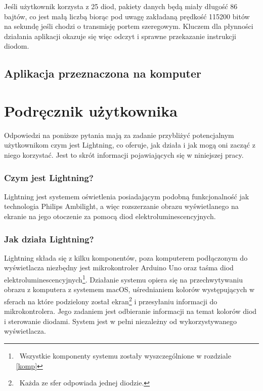 \documentclass[12pt]{report}
\begin{document}
Jeśli użytkownik korzysta z 25 diod, pakiety danych będą miały długość 86 bajtów, co jest małą liczbą biorąc pod uwagę zakładaną prędkość 115200 bitów na sekundę jeśli chodzi o transmisję portem szeregowym. Kluczem dla płynności działania aplikacji okazuje się więc odczyt i sprawne przekazanie instrukcji diodom.













\subsection{Aplikacja przeznaczona na komputer}














\section{Podręcznik użytkownika}

Odpowiedzi na poniższe pytania mają za zadanie przybliżyć potencjalnym użytkownikom czym jest Lightning, co oferuje, jak działa i jak mogą oni zacząć z niego korzystać. Jest to skrót informacji pojawiających się w niniejszej pracy.

\subsubsection{Czym jest Lightning?}

Lightning jest systemem oświetlenia posiadającym podobną funkcjonalność jak technologia Philips Ambilight, a więc rozszerzanie obrazu wyświetlanego na ekranie na jego otoczenie za pomocą diod elektroluminescencyjnych.

\subsubsection{Jak działa Lightning?}

Lightning składa się z kilku komponentów, poza komputerem podłączonym do wyświetlacza niezbędny jest mikrokontroler Arduino Uno oraz taśma diod elektroluminescencyjnych\footnote{~Wszystkie komponenty systemu zostały wyszczególnione w rozdziale \ref{komp}}. Działanie systemu opiera się na przechwytywaniu obrazu z komputera z systemem macOS, uśrednianiem kolorów występujących w sferach na które podzielony został ekran\footnote{~Każda ze sfer odpowiada jednej diodzie.} i przesyłaniu informacji do mikrokontrolera. Jego zadaniem jest odbieranie informacji na temat kolorów diod i sterowanie diodami. System jest w pełni niezależny od wykorzystywanego wyświetlacza.
\end{document}
